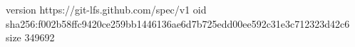 version https://git-lfs.github.com/spec/v1
oid sha256:f002b58ffc9420ce259bb1446136ae6d7b725edd00ee592c31e3c712323d42c6
size 349692
